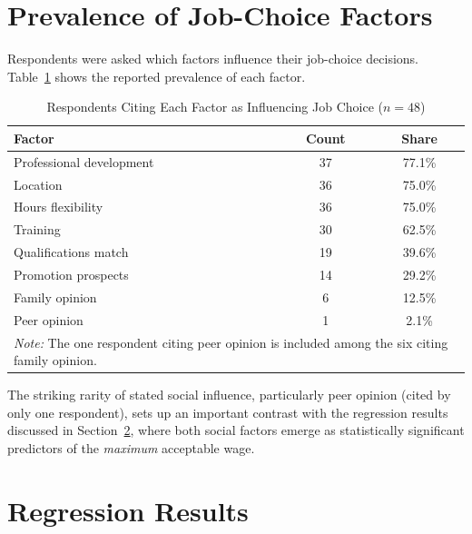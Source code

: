 \documentclass[12pt]{article}
\begin{document}


\section{Prevalence of Job-Choice Factors}

Respondents were asked which factors influence their job-choice decisions.
Table~\ref{tab:social} shows the reported prevalence of each factor.

\begin{table}[h!]
\centering
\caption{Respondents Citing Each Factor as Influencing Job Choice ($n = 48$)}
\label{tab:social}
\begin{tabular}{lcc}
\toprule
\textbf{Factor} & \textbf{Count} & \textbf{Share} \\
\midrule
Professional development & 37 & 77.1\% \\
Location                 & 36 & 75.0\% \\
Hours flexibility        & 36 & 75.0\% \\
Training                 & 30 & 62.5\% \\
Qualifications match     & 19 & 39.6\% \\
Promotion prospects      & 14 & 29.2\% \\
Family opinion           &  6 & 12.5\% \\
Peer opinion             &  1 &  2.1\% \\
\bottomrule
\multicolumn{3}{l}{\footnotesize \textit{Note:} The one respondent citing peer opinion is included among the six citing family opinion.}\\
\end{tabular}
\end{table}

The striking rarity of stated social influence, particularly peer opinion (cited by
only one respondent), sets up an important contrast with the regression results
discussed in Section~\ref{sec:reg}, where both social factors emerge as statistically
significant predictors of the \emph{maximum} acceptable wage.

\section{Regression Results}
\label{sec:reg}
\end{document}
